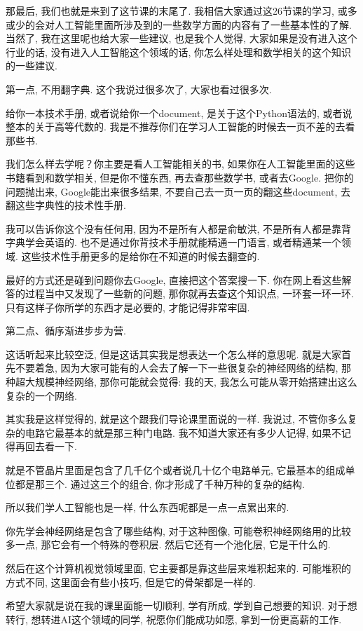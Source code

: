 那最后, 我们也就是来到了这节课的末尾了. 我相信大家通过这26节课的学习, 或多或少的会对人工智能里面所涉及到的一些数学方面的内容有了一些基本性的了解. 当然了, 我在这里呢也给大家一些建议, 也是我个人觉得, 大家如果是没有进入这个行业的话, 没有进入人工智能这个领域的话, 你怎么样处理和数学相关的这个知识的一些建议. 

第一点, 不用翻字典. 这个我说过很多次了, 大家也看过很多次. 

给你一本技术手册, 或者说给你一个document, 是关于这个Python语法的, 或者说整本的关于高等代数的. 我是不推荐你们在学习人工智能的时候去一页不差的去看那些书. 

我们怎么样去学呢？你主要是看人工智能相关的书, 如果你在人工智能里面的这些书籍看到和数学相关, 但是你不懂东西, 再去查那些数学书, 或者去Google. 把你的问题抛出来, Google能出来很多结果, 不要自己去一页一页的翻这些document, 去翻这些字典性的技术性手册. 

我可以告诉你这个没有任何用, 因为不是所有人都是俞敏洪, 不是所有人都是靠背字典学会英语的. 也不是通过你背技术手册就能精通一门语言, 或者精通某一个领域. 这些技术性手册更多的是给你在不知道的时候去翻查的. 

最好的方式还是碰到问题你去Google, 直接把这个答案搜一下. 你在网上看这些解答的过程当中又发现了一些新的问题, 那你就再去查这个知识点, 一环套一环一环. 只有这样子你所学的东西才是必要的, 才能记得非常牢固. 

第二点、循序渐进步步为营. 

这话听起来比较空泛, 但是这话其实我是想表达一个怎么样的意思呢. 就是大家首先不要着急, 因为大家可能有的人会去了解一下一些很复杂的神经网络的结构, 那种超大规模神经网络, 那你可能就会觉得: 我的天, 我怎么可能从零开始搭建出这么复杂的一个网络. 

其实我是这样觉得的, 就是这个跟我们导论课里面说的一样. 我说过, 不管你多么复杂的电路它最基本的就是那三种门电路. 我不知道大家还有多少人记得, 如果不记得再回去看一下. 

就是不管晶片里面是包含了几千亿个或者说几十亿个电路单元, 它最基本的组成单位都是那三个. 通过这三个的组合, 你才形成了千种万种的复杂的结构. 

所以我们学人工智能也是一样, 什么东西呢都是一点一点累出来的. 

你先学会神经网络是包含了哪些结构, 对于这种图像, 可能卷积神经网络用的比较多一点, 那它会有一个特殊的卷积层. 然后它还有一个池化层, 它是干什么的. 

然后在这个计算机视觉领域里面, 它主要都是靠这些层来堆积起来的. 可能堆积的方式不同, 这里面会有些小技巧, 但是它的骨架都是一样的. 

希望大家就是说在我的课里面能一切顺利, 学有所成, 学到自己想要的知识. 对于想转行, 想转进AI这个领域的同学, 祝愿你们能成功如愿, 拿到一份更高薪的工作. 

